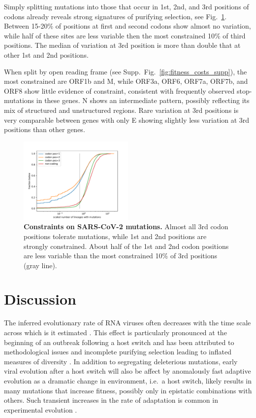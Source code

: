 \documentclass[aps,rmp, twocolumn]{revtex4}
\begin{document}
Simply splitting mutations into those that occur in 1st, 2nd, and 3rd positions of codons already reveals strong signatures of purifying selection, see Fig.~\ref{fig:fitness_costs}.
Between 15-20\% of positions at first and second codons show almost no variation, while half of these sites are less variable then the most constrained 10\% of third positions.
The median of variation at 3rd position is more than double that at other 1st and 2nd positions.

When split by open reading frame (see Supp.~Fig.~\ref{fig:fitness_costs_supp}), the most constrained are ORF1b and M, while ORF3a, ORF6, ORF7a, ORF7b, and ORF8 show little evidence of constraint, consistent with frequently observed stop-mutations in these genes.
N shows an intermediate pattern, possibly reflecting its mix of structured and unstructured regions.
Rare variation at 3rd positions is very comparable between genes with only E showing slightly less variation at 3rd positions than other genes.



\begin{figure}
    \includegraphics[width=0.5\textwidth]{figures/fitness_cost.pdf}
    \caption{{\bf Constraints on SARS-CoV-2 mutations.}
    Almost all 3rd codon positions tolerate mutations, while 1st and 2nd positions are strongly constrained.
    About half of the 1st and 2nd codon positions are less variable than the most constrained 10\% of 3rd positions (gray line).
    \label{fig:fitness_costs}}
 \end{figure}


\section*{Discussion}
The inferred evolutionary rate of RNA viruses often decreases with the time scale across which is it estimated \citep{wertheim_purifying_2011,ghafari_prisoner_2021}.
This effect is particularly pronounced at the beginning of an outbreak following a host switch and has been attributed to methodological issues and incomplete purifying selection leading to inflated measures of diversity \citep{meyer_time_2015,ghafari_purifying_2022}.
In addition to segregating deleterious mutations, early viral evolution after a host switch will also be affect by anomalously fast adaptive evolution as a dramatic change in environment, i.e.~a host switch, likely results in many mutations that increase fitness, possibly only in epistatic combinations with others.
Such transient increases in the rate of adaptation is common in experimental evolution \citep{elena_virus_2007}.
\end{document}
